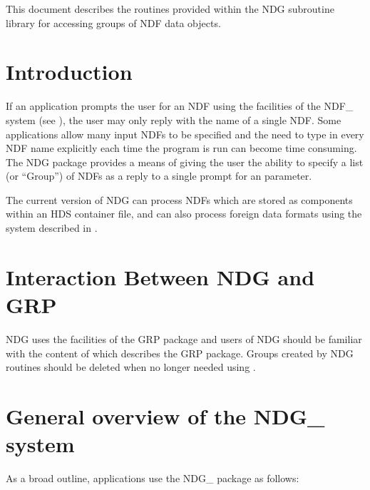 
This document describes the routines provided within the NDG subroutine 
library for accessing groups of NDF data objects. 

 \newpage
 \begin{latexonly}
   \setlength{\parskip}{0mm}
   \latexonlytoc
   \setlength{\parskip}{\medskipamount}
   \markright{\stardocname}
 \end{latexonly}
\newpage
\renewcommand{\thepage}{\arabic{page}}
\setcounter{page}{1}

\section {Introduction}

If an application prompts the user for an NDF using the facilities of the NDF\_ 
system (see ), the user may only reply with the name of a single NDF. Some
applications allow many input NDFs to be specified and the need to
type in every NDF name explicitly each time the program is run can become time
consuming. The NDG package provides a means of giving the user the
ability to specify a list (or ``Group'') of NDFs as a reply to a single prompt
for an parameter. 

The current version of NDG can process NDFs which are stored as
components within an HDS container file, and can also process foreign
data formats using the system described in .


\section {Interaction Between NDG and GRP}
NDG uses the facilities of the GRP package and users of NDG should be familiar
with the content of  which describes the GRP package. Groups
created by NDG routines should be deleted when no longer needed using
.

\section {General overview of the NDG\_ system}
As a broad outline, applications use the NDG\_ package as follows:

